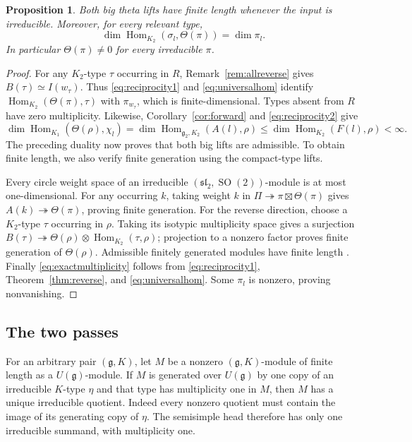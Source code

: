 \documentclass[11pt]{article}
\newcommand{\Hom}{\operatorname{Hom}}
\newcommand{\SO}{\operatorname{SO}}
\newcommand{\fg}{\mathfrak g}
\newtheorem{proposition}[theorem]{Proposition}
\theoremstyle{definition}
\numberwithin{equation}{section}
\begin{document}
\begin{proposition}\label{prop:finiteness}
Both big theta lifts have finite length whenever the input is
irreducible. Moreover, for every relevant type,
\begin{equation}\label{eq:exactmultiplicity}
 \dim\Hom_{K_2}(\sigma_l,\Theta(\pi))=\dim\pi_l.
\end{equation}
In particular $\Theta(\pi)\ne0$ for every irreducible $\pi$.
\end{proposition}
\begin{proof}
For any $K_2$-type $\tau$ occurring in $R$,
Remark~\ref{rem:allreverse} gives $B(\tau)\simeq I(w_\tau)$.
Thus \eqref{eq:reciprocity1} and \eqref{eq:universalhom} identify
$\Hom_{K_2}(\Theta(\pi),\tau)$ with $\pi_{w_\tau}$, which is
finite-dimensional. Types absent from $R$ have zero multiplicity.
Likewise, Corollary~\ref{cor:forward} and \eqref{eq:reciprocity2} give
\[
 \dim\Hom_{K_1}(\Theta(\rho),\chi_l)
 =\dim\Hom_{\fg_2,K_2}(A(l),\rho)
 \leq\dim\Hom_{K_2}(F(l),\rho)<\infty.
\]
The preceding duality now proves that both big lifts are admissible.
To obtain finite length, we also verify finite generation using the
compact-type lifts.

Every circle weight space of an irreducible
$(\mathfrak{sl}_2,\SO(2))$-module is at most one-dimensional.
For any occurring $k$, taking weight $k$ in
$\Pi\twoheadrightarrow\pi\boxtimes\Theta(\pi)$ gives
$A(k)\twoheadrightarrow\Theta(\pi)$, proving finite generation.
For the reverse direction, choose a $K_2$-type $\tau$ occurring in
$\rho$. Taking its isotypic multiplicity space gives a surjection
$B(\tau)\twoheadrightarrow
\Theta(\rho)\otimes\Hom_{K_2}(\tau,\rho)$; projection to a nonzero
factor proves finite generation of $\Theta(\rho)$.
Admissible finitely generated modules have finite length
\cite{Wallach}. Finally \eqref{eq:exactmultiplicity} follows from
\eqref{eq:reciprocity1}, Theorem~\ref{thm:reverse}, and
\eqref{eq:universalhom}. Some $\pi_l$ is nonzero, proving nonvanishing.
\end{proof}

\subsection{The two passes}
For an arbitrary pair $(\fg,K)$, let $M$ be a nonzero $(\fg,K)$-module
of finite length as a $U(\fg)$-module. If $M$ is generated over
$U(\fg)$ by one copy of an irreducible $K$-type $\eta$ and that type
has multiplicity one in $M$, then $M$ has a unique irreducible quotient. Indeed every nonzero quotient must contain the
image of its generating copy of $\eta$. The semisimple head therefore
has only one irreducible summand, with multiplicity one.
\end{document}
